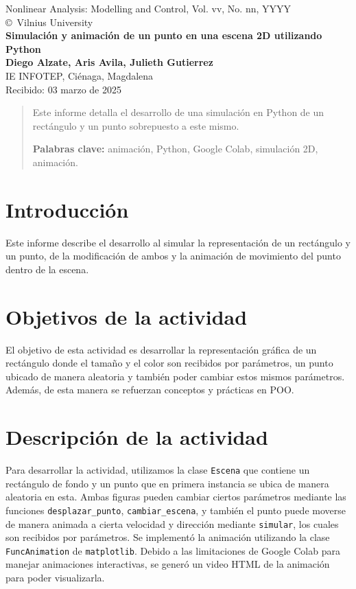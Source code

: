 \documentclass[a4paper, 10pt]{article}
\begin{document}
\begin{center}
Nonlinear Analysis: Modelling and Control, Vol. vv, No. nn, YYYY\\
\copyright\ Vilnius University\\[24pt]
\LARGE
\textbf{Simulación y animación de un punto en una escena 2D utilizando Python}\\[6pt]
\small
\textbf {Diego Alzate, Aris Avila, Julieth Gutierrez}\\[6pt]
IE INFOTEP, Ciénaga, Magdalena \\[6pt]
Recibido: 03 marzo de 2025\quad\quad
\end{center}

\begin{abstract}
Este informe detalla el desarrollo de una simulación en Python de un rectángulo y un punto sobrepuesto a este mismo.
\vskip 2mm

\textbf{Palabras clave:} animación, Python, Google Colab, simulación 2D, animación.
\end{abstract}

\section{Introducción}\label{s:1}
Este informe describe el desarrollo al simular la representación de un rectángulo y un punto, de la modificación de ambos y la animación de movimiento del punto dentro de la escena.

\section{Objetivos de la actividad}\label{s:2}
El objetivo de esta actividad es desarrollar la representación gráfica de un rectángulo donde el tamaño y el color son recibidos por parámetros, un punto ubicado de manera aleatoria y también poder cambiar estos mismos parámetros. Además, de esta manera se refuerzan conceptos y prácticas en POO.

\section{Descripción de la actividad}\label{s:3}
Para desarrollar la actividad, utilizamos la clase \texttt{Escena} que contiene un rectángulo de fondo y un punto que en primera instancia se ubica de manera aleatoria en esta. Ambas figuras pueden cambiar ciertos parámetros mediante las funciones \texttt{desplazar\_punto}, \texttt{cambiar\_escena}, y también el punto puede moverse de manera animada a cierta velocidad y dirección mediante \texttt{simular}, los cuales son recibidos por parámetros. Se implementó la animación utilizando la clase \texttt{FuncAnimation} de \texttt{matplotlib}. Debido a las limitaciones de Google Colab para manejar animaciones interactivas, se generó un video HTML de la animación para poder visualizarla.
\end{document}
